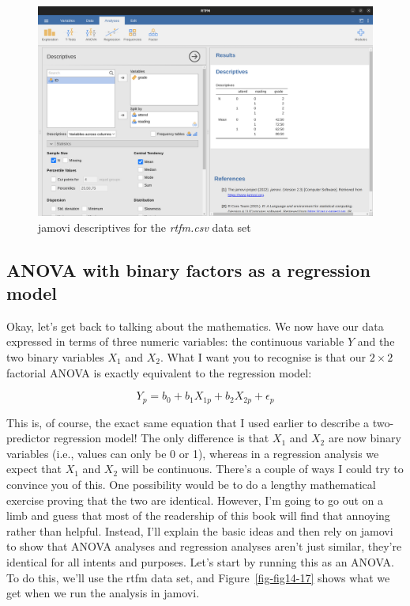 \documentclass[
  a4paper,
]{book}
\begin{document}
\begin{figure}

\includegraphics[width=1\textwidth,height=\textheight]{images/fig14-16.png} \hfill{}

\caption{\label{fig-fig14-16}jamovi descriptives for the \emph{rtfm.csv}
data set}

\end{figure}

\hypertarget{anova-with-binary-factors-as-a-regression-model}{%
\subsection{ANOVA with binary factors as a regression
model}\label{anova-with-binary-factors-as-a-regression-model}}

Okay, let's get back to talking about the mathematics. We now have our
data expressed in terms of three numeric variables: the continuous
variable \(Y\) and the two binary variables \(X_1\) and \(X_2\). What I
want you to recognise is that our \(2 \times 2\) factorial ANOVA is
exactly equivalent to the regression model:

\[Y_p=b_0+b_1 X_{1p} + b_2 X_{2p} + \epsilon_p\]

This is, of course, the exact same equation that I used earlier to
describe a two-predictor regression model! The only difference is that
\(X_1\) and \(X_2\) are now binary variables (i.e., values can only be 0
or 1), whereas in a regression analysis we expect that \(X_1\) and
\(X_2\) will be continuous. There's a couple of ways I could try to
convince you of this. One possibility would be to do a lengthy
mathematical exercise proving that the two are identical. However, I'm
going to go out on a limb and guess that most of the readership of this
book will find that annoying rather than helpful. Instead, I'll explain
the basic ideas and then rely on jamovi to show that ANOVA analyses and
regression analyses aren't just similar, they're identical for all
intents and purposes. Let's start by running this as an ANOVA. To do
this, we'll use the rtfm data set, and Figure~\ref{fig-fig14-17} shows
what we get when we run the analysis in jamovi.
\end{document}
